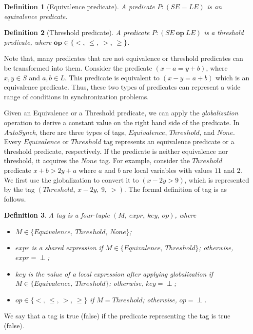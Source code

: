 \documentclass[preprint]{sigplanconf}
\newtheorem{definition}{Definition}
\begin{document}
\begin{definition}[Equivalence predicate]
    A predicate $P: (SE = LE)$ is an equivalence predicate.
\end{definition}
\begin{definition}[Threshold predicate]
   A predicate $P: (SE\ \boldsymbol{op}\ LE)$ is a threshold predicate, where 
   $\boldsymbol{op}
    \in \{<,\ \le,\ >,\ \ge\}$.
    \end{definition}
Note that, many predicates that are not equivalence or threshold predicates can 
be transformed into them. Consider the predicate $(x - a = y + b)$, where 
$x, y \in S$ and $a,b \in L$. This predicate is equivalent to 
$(x - y = a + b)$ which is an equivalence predicate. Thus, these two types of 
predicates can represent a wide range of conditions in synchronization problems. 

Given an Equivalence or a Threshold predicate, we can apply the {\em globalization} operation 
to derive a constant value on the right hand side of the predicate. 
%
In {\em AutoSynch}, there are three types of tags, $Equivalence$, $Threshold$, and 
$None$. Every $Equivalence$ or $Threshold$ tag represents an equivalence predicate 
or a threshold predicate, respectively. 
If the predicate is neither equivalence nor threshold, it acquires the $None$
tag. For example, consider the $Threshold$ predicate $x + b > 2y + a$ where $a$ 
and $b$ are local variables with values $11$ and $2$.
We first use the globalization to convert it to $(x - 2y > 9)$, which is
represented by the tag $(Threshold,\ x - 2y,\ 9,\ >)$. The formal definition of
tag is as follows. 
\begin{definition}
   A tag is a four-tuple $(M,\ expr,\ key,\ op)$, where  
   \begin{itemize}
      \item $M \in \{Equivalence,\ Threshold,\ None\}$;
      \item $expr$ is a shared expression if 
          $M \in \{Equivalence,\ Threshold\}$; otherwise, $expr= \perp$;
      \item $key$ is the value of a local expression after applying
          globalization if $M \in \{Equivalence,\ Threshold\}$; otherwise, 
          $key= \perp$;
      \item $op \in \{<,\ \le,\ >,\ \ge\}$ if $M = Threshold$; otherwise, 
         $op = \perp$.
   \end{itemize}
\end{definition}
We say that a tag is true (false) if the predicate representing the tag is 
true (false).
 
\end{document}
